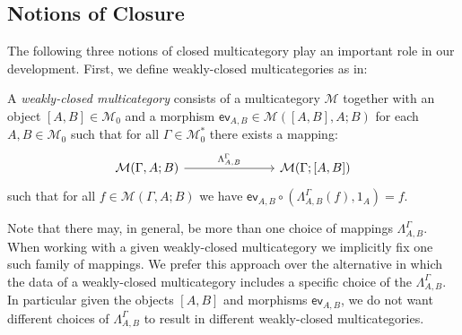 \documentclass{llncs}
\begin{document}
\subsection{Notions of Closure}
The following three notions of closed multicategory play an important role in our development. First, we define weakly-closed multicategories as in:
\begin{definition}\label{def:weakly-closed-multicategory}
    A \emph{weakly-closed multicategory} consists of a multicategory $\mathcal{M}$ together with an object $[A,B] \in \mathcal{M}_0$ and a morphism $\mathsf{ev}_{A,B} \in \mathcal{M}([A,B],A;B)$ for each $A,B \in \mathcal{M}_0$ such that for all $\Gamma \in \mathcal{M}_0^*$ there exists a mapping:
  \[
    \begin{tikzcd}
      \mathcal{M}(\Gamma,A;B) \ar[rrr,"{\Lambda^\Gamma_{A,B}}"] &&& \mathcal{M}(\Gamma;[A,B])
    \end{tikzcd}
  \]
  such that for all $f \in \mathcal{M}(\Gamma,A;B)$ we have $\mathsf{ev}_{A,B} \circ (\Lambda^\Gamma_{A,B}(f),1_A) = f$.
\end{definition}
Note that there may, in general, be more than one choice of mappings $\Lambda^\Gamma_{A,B}$. When working with a given weakly-closed multicategory we implicitly fix one such family of mappings. We prefer this approach over the alternative in which the data of a weakly-closed multicategory includes a specific choice of the $\Lambda^\Gamma_{A,B}$. In particular given the objects $[A,B]$ and morphisms $\mathsf{ev}_{A,B}$, we do not want different choices of $\Lambda^\Gamma_{A,B}$ to result in different weakly-closed multicategories.
\end{document}

